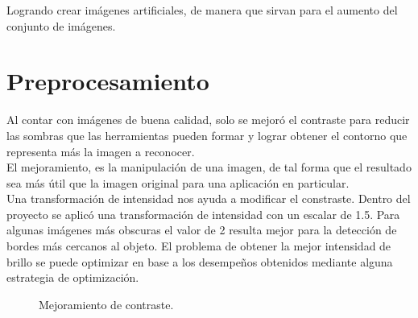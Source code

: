 \documentclass[a4paper, 11pt]{article}
\begin{document}
Logrando crear imágenes artificiales, de manera que sirvan para el aumento del conjunto de imágenes.\\

\pagebreak
\section{Preprocesamiento}

Al contar con imágenes de buena calidad, solo se mejoró el contraste para reducir las sombras que las herramientas pueden formar y lograr obtener el contorno que representa más la imagen a reconocer.\\

El mejoramiento, es la manipulación de una imagen, de tal forma que el resultado sea más útil que la imagen original para una aplicación en particular.\\

Una transformación de intensidad nos ayuda a modificar el constraste. Dentro del proyecto se aplicó una transformación de intensidad con un escalar de 1.5. Para algunas imágenes más obscuras el valor de 2 resulta mejor para la detección de bordes más cercanos al objeto. El problema de obtener la mejor intensidad de brillo se puede optimizar en base a los desempeños obtenidos mediante alguna estrategia de optimización.\\

\begin{figure}[ht]%
    \centering
    \qquad
    \caption{Mejoramiento de contraste.}%
    \label{fig:grayImage}%
\end{figure}
\end{document}
